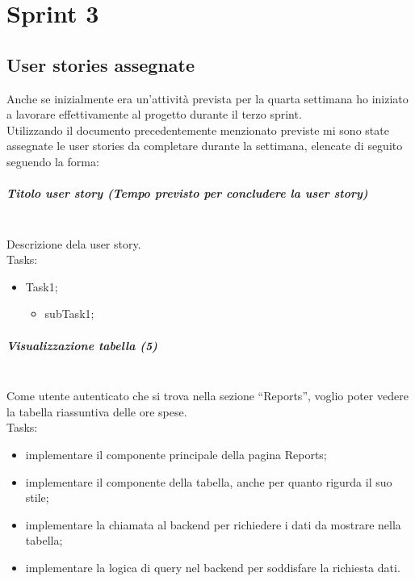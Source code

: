
\chapter{Sprint 3}
\label{cap:sprint3}
\section{User stories assegnate}
Anche se inizialmente era un'attività prevista per la quarta settimana ho iniziato a lavorare effettivamente al progetto durante il terzo sprint. \\
Utilizzando il documento precedentemente menzionato previste mi sono state assegnate le user stories da completare durante la settimana, elencate di seguito seguendo la forma:

\paragraph{Titolo user story (Tempo previsto per concludere la user story)}\mbox{} \\[\baselineskip]
\noindent Descrizione dela user story. \\

\noindent Tasks:

\begin{itemize}
  \item Task1;
  \begin{itemize}
    \item subTask1;
  \end{itemize}
\end{itemize}
\vspace*{5pt}
\paragraph{Visualizzazione tabella (5)}\mbox{} \\[\baselineskip]
\noindent Come utente autenticato che si trova nella sezione “Reports”, voglio poter vedere la tabella riassuntiva delle ore spese. \\

\noindent Tasks:

\begin{itemize}
  \item implementare il componente principale della pagina Reports;
  \item implementare il componente della tabella, anche per quanto rigurda il suo stile;
  \item implementare la chiamata al backend per richiedere i dati da mostrare nella tabella;
  \item implementare la logica di query nel backend per soddisfare la richiesta dati.
\end{itemize}

